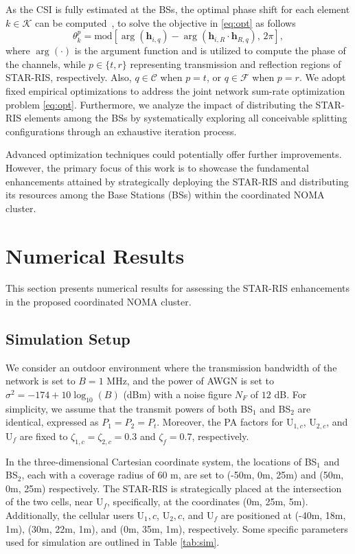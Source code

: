 \documentclass[conference]{IEEEtran}
\begin{document}
As the CSI is fully estimated at the BSs, the optimal phase shift for each element $k \in \mathcal{K}$ can be computed~\cite{wu2019intelligent}, to solve the objective in \ref{eq:opt} as follows
\begin{equation}
    \theta_k^p = \text{mod}[\arg(\textbf{h}_{i,q}) - \arg(\textbf{h}_{i,R}\cdot \textbf{h}_{R, q}),\,2\pi],
\end{equation}
where $\arg(\cdot)$ is the argument function and is utilized to compute the phase of the channels, while $p \in \{t, r\}$ representing transmission and reflection regions of STAR-RIS, respectively. Also, $q \in \mathcal{C}$ when $p=t$, or $q \in \mathcal{F}$ when $p=r$. We adopt fixed empirical optimizations to address the joint network sum-rate optimization problem \ref{eq:opt}. Furthermore, we analyze the impact of distributing the STAR-RIS elements among the BSs by systematically exploring all conceivable splitting configurations through an exhaustive iteration process.

Advanced optimization techniques could potentially offer further improvements. However, the primary focus of this work is to showcase the fundamental enhancements attained by strategically deploying the STAR-RIS and distributing its resources among the Base Stations (BSs) within the coordinated NOMA cluster.

\section{Numerical Results}
This section presents numerical results for assessing the STAR-RIS enhancements in the proposed coordinated NOMA cluster.
\subsection{Simulation Setup}
We consider an outdoor environment where the transmission bandwidth of the network is set to $B = 1$ MHz, and the power of AWGN is set to $\sigma^2 = -174 + 10\log_{10}\left(B\right)$ (dBm) with a noise figure $N_F$ of $12$ dB. For simplicity, we assume that the transmit powers of both BS$_1$ and BS$_2$ are identical, expressed as $P_1 = P_2 = P_t$. Moreover, the PA factors for U$_{1,c}$, U$_{2,c}$, and U$_f$ are fixed to $\zeta_{1,c}=\zeta_{2,c}=0.3$ and $\zeta_f=0.7$, respectively.

In the three-dimensional Cartesian coordinate system, the locations of BS$_1$ and BS$_2$, each with a coverage radius of 60 m, are set to (-50m, 0m, 25m) and (50m, 0m, 25m) respectively. The STAR-RIS is strategically placed at the intersection of the two cells, near U$_f$, specifically, at the coordinates (0m, 25m, 5m). Additionally, the cellular users U$_1,c$, U$_2,c$, and U$_f$ are positioned at (-40m, 18m, 1m), (30m, 22m, 1m), and (0m, 35m, 1m), respectively. Some specific parameters used for simulation are outlined in Table \ref{tab:sim}.
\end{document}
